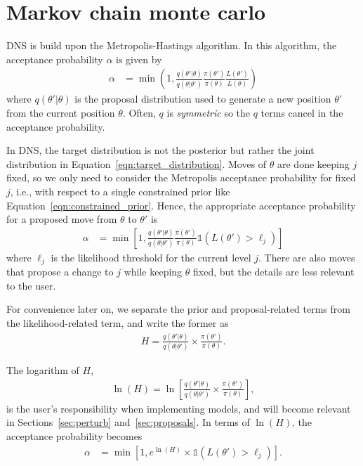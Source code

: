 \documentclass[article, nojss]{jss}
\newcommand{\params}{\theta}
\begin{document}
\section{Markov chain monte carlo}\label{sec:mcmc}
DNS is build upon the Metropolis-Hastings algorithm.
In this algorithm, the acceptance probability $\alpha$
is given by
\begin{align}
\alpha &= \min\left(1,
\frac{q(\params'|\params)}{q(\params | \params')}
\frac{\pi(\params')}{\pi(\params)}\frac{L(\params')}{L(\params)}
\right)
\end{align}
where $q(\theta' | \theta)$ is the proposal distribution used to generate
a new position $\theta'$ from the current position $\theta$. Often,
$q$ is {\em symmetric} so the $q$ terms cancel in the acceptance probability.

In DNS, the target distribution is not the posterior but rather
the joint distribution in Equation~\ref{eqn:target_distribution}.
Moves of $\theta$ are done keeping $j$ fixed, so we only need
to consider the Metropolis acceptance probability for fixed $j$,
i.e., with respect to a single constrained prior like
Equation~\ref{eqn:constrained_prior}.
Hence, the appropriate acceptance probability
for a proposed move from $\theta$ to $\theta'$ is
\begin{align}
\alpha &= \min\left[1,
\frac{q(\params'|\params)}{q(\params | \params')}
\frac{\pi(\params')}{\pi(\params)}
\mathds{1}\left(L(\params') > \ell_j\right)
\right]
\label{eqn:log_hastings}
\end{align}
where $\ell_j$ is the likelihood threshold for the current level $j$.
There are also moves that propose a change to $j$ while keeping
$\params$ fixed, but the details are less relevant to the user.

For convenience later on, we 
separate the prior and proposal-related terms from
the likelihood-related term, and write the former as
\begin{align}
H = \frac{q(\params'|\params)}{q(\params | \params')}
\times \frac{\pi(\params')}{\pi(\params)}.
\end{align}

The logarithm of $H$,
\begin{align}
\ln(H) = \ln\left[\frac{q(\params'|\params)}{q(\params | \params')}
\times \frac{\pi(\params')}{\pi(\params)}\right],
\end{align}
is the user's responsibility when implementing models,
and will become relevant in Sections~\ref{sec:perturb}
and~\ref{sec:proposals}.
In terms of $\ln(H)$, the
acceptance probability becomes
\begin{align}
\alpha &= \min\left[1,
e^{\ln(H)}\times
\mathds{1}\left(L(\params') > \ell_j\right)
\right].\label{eqn:logH}
\end{align}
\end{document}
